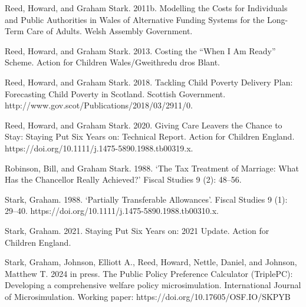 \documentclass[
  letterpaper,
  DIV=11,
  numbers=noendperiod]{scrartcl}
\begin{document}
Reed, Howard, and Graham Stark. 2011b. Modelling the Costs for
Individuals and Public Authorities in Wales of Alternative Funding
Systems for the Long-Term Care of Adults. Welsh Assembly Government.

Reed, Howard, and Graham Stark. 2013. Costing the ``When I Am Ready''
Scheme. Action for Children Wales/Gweithredu dros Blant.

Reed, Howard, and Graham Stark. 2018. Tackling Child Poverty Delivery
Plan: Forecasting Child Poverty in Scotland. Scottish Government.
http://www.gov.scot/Publications/2018/03/2911/0.

Reed, Howard, and Graham Stark. 2020. Giving Care Leavers the Chance to
Stay: Staying Put Six Years on: Technical Report. Action for Children
England. https://doi.org/10.1111/j.1475-5890.1988.tb00319.x.

Robinson, Bill, and Graham Stark. 1988. `The Tax Treatment of Marriage:
What Has the Chancellor Really Achieved?' Fiscal Studies 9 (2): 48--56.

Stark, Graham. 1988. `Partially Transferable Allowances'. Fiscal Studies
9 (1): 29--40. https://doi.org/10.1111/j.1475-5890.1988.tb00310.x.

Stark, Graham. 2021. Staying Put Six Years on: 2021 Update. Action for
Children England.

Stark, Graham, Johnson, Elliott A., Reed, Howard, Nettle, Daniel, and
Johnson, Matthew T. 2024 in press. The Public Policy Preference
Calculator (TriplePC): Developing a comprehensive welfare policy
microsimulation. International Journal of Microsimulation. Working
paper: https://doi.org/10.17605/OSF.IO/SKPYB
\end{document}

